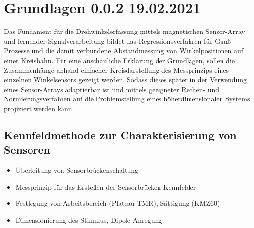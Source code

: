%

\chapter{Grundlagen 0.0.2 19.02.2021}\label{ch:grundlagen}

Das Fundament für die Drehwinkelerfassung mittels magnetischen Sensor-Array und lernender Signalverarbeitung 
\cite{Schuethe2019}\cite{Schuethe2020a}\cite{Schuethe2020} bildet das Regressionsverfahren für Gauß-Prozesse 
\cite{Rasmussen2006} und die damit verbundene Abstandmessung von Winkelpositionen auf einer Kreisbahn.
Für eine anschauliche Erklärung der Grundlagen, sollen die Zusammenhänge anhand einfacher Kreisdarstellung des 
Messprinzips eines einzelnen Winkelsensors gezeigt werden. Sodass dieses später in der Verwendung eines Sensor-Arrays 
adaptierbar ist und mittels geeigneter Rechen- und Normierungsverfahren auf die Problemstellung eines 
höherdimensionalen Systems projiziert werden kann.









\clearpage


\section{Kennfeldmethode zur Charakterisierung von Sensoren}\label{sec:kennfeldmethode-zur-charakterisierung}
	\begin{itemize}
		\item Überleitung von Sensorbrückenschaltung
		\item Messprinzip für das Erstellen der Sensorbrücken-Kennfelder
		\item Festlegung von Arbeitsbereich (Plateau TMR), Sättigung (KMZ60)
		\item Dimensionierung des Stimulus, Dipole Anregung
	\end{itemize}
	

